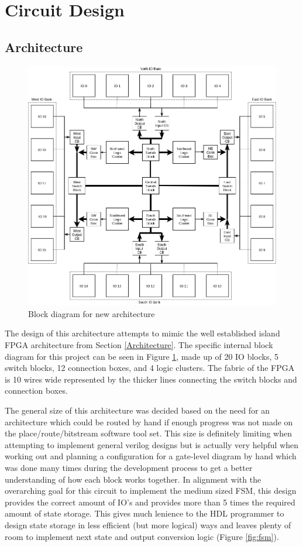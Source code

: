 \documentclass[12pt]{article}
\begin{document}
\newpage
\section{Circuit Design} \label{sec:design}

\subsection{Architecture}

\begin{figure}[htb]
  \centering
  \includegraphics[width=.9\textwidth]{internal_block}
  \caption{Block diagram for new architecture}
  \label{fig:internal_block}
\end{figure}

The design of this architecture attempts to mimic the well established island FPGA 
architecture from Section \ref{Architecture}. 
The specific internal block diagram for this project can be seen in Figure \ref{fig:internal_block},
made up of 20 IO blocks, 5 switch blocks, 12 connection boxes, and 4 logic clusters.
The fabric of the FPGA is 10 wires wide represented
by the thicker lines connecting the switch blocks and connection boxes.

The general size of this architecture was decided based on the need for an architecture
which could be routed by hand if enough progress was not made on the place/route/bitstream software
tool set. This size is definitely limiting when attempting to implement general
verilog designs but is actually very helpful when working out and planning a configuration
for a gate-level diagram by hand which was done many times during the development process
to get a better understanding of how each block works together. In alignment with the overarching
goal for this circuit to implement the medium sized FSM, this design provides the correct amount
of IO's and provides more than 5 times the required amount of state storage. This gives much lenience 
to the HDL programmer to design state storage in less efficient (but more logical) ways and leaves
plenty of room to implement next state and output conversion logic (Figure \ref{fig:fsm}).
\end{document}
